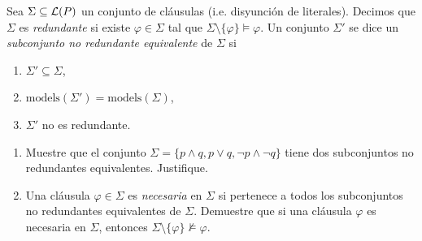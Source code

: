 
Sea $\Sigma\subseteq\mathcal{L}(P)$ un conjunto de cláusulas (i.e. disyunción de literales). Decimos que $\Sigma$ es \textit{redundante} si existe $\varphi\in\Sigma$ tal que $\Sigma\setminus\{\varphi\}\models\varphi$. Un conjunto $\Sigma'$ se dice un \textit{subconjunto no redundante equivalente} de $\Sigma$ si 
\begin{enumerate}
    \item $\Sigma'\subseteq\Sigma$,
    \item $\text{models}(\Sigma')=\text{models}(\Sigma)$,
    \item $\Sigma'$ no es redundante.
\end{enumerate}
\begin{enumerate}[label=(\alph*)]
    \item Muestre que el conjunto $\Sigma=\{p\wedge q,p\vee q, \neg p\wedge\neg q\}$ tiene dos subconjuntos no redundantes equivalentes. Justifique.
    \item Una cláusula $\varphi\in\Sigma$ es \textit{necesaria} en $\Sigma$ si pertenece a todos los subconjuntos no redundantes equivalentes de $\Sigma$. Demuestre que si una cláusula $\varphi$ es necesaria en $\Sigma$, entonces $\Sigma\setminus\{\varphi\}\not\models\varphi.$
\end{enumerate}
